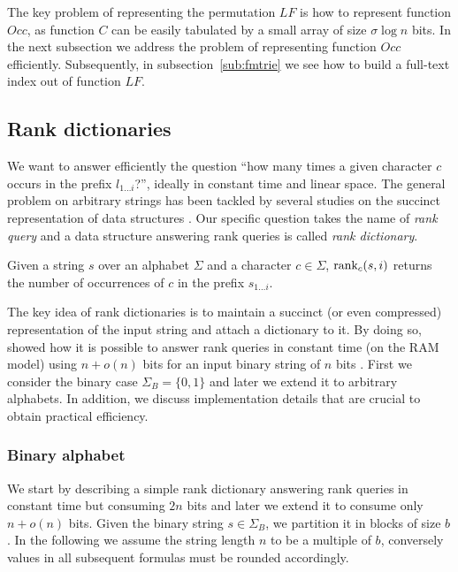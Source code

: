 The key problem of representing the permutation $LF$ is how to represent function $Occ$, as function $C$ can be easily tabulated by a small array of size $\sigma \log{n}$ bits.
In the next subsection we address the problem of representing function $Occ$ efficiently. Subsequently, in subsection~\ref{sub:fmtrie} we see how to build a full-text index out of function $LF$.

\subsection{Rank dictionaries}

We want to answer efficiently the question ``how many times a given character $c$ occurs in the prefix $l_{1 \dots i}$?'', ideally in constant time and linear space.
The general problem on arbitrary strings has been tackled by several studies on the succinct representation of data structures \citep{Jacobson1989}.
Our specific question takes the name of \emph{rank query} and a data structure answering rank queries is called \emph{rank dictionary}.

\begin{definition}
Given a string $s$ over an alphabet $\Sigma$ and a character $c \in \Sigma$, $\text{rank}_c(s, i)$ returns the number of occurrences of $c$ in the prefix $s_{1 \dots i}$.
\end{definition}

The key idea of rank dictionaries is to maintain a succinct (or even compressed) representation of the input string and attach a dictionary to it.
By doing so, \citeauthor{Jacobson1989} showed how it is possible to answer rank queries in constant time (on the RAM model) using $n+o(n)$ bits for an input binary string of $n$ bits \citep{Jacobson1989}.
First we consider the binary case $\Sigma_B = \{ 0, 1 \}$ and later we extend it to arbitrary alphabets.
In addition, we discuss implementation details that are crucial to obtain practical efficiency.

\subsubsection{Binary alphabet}

We start by describing a simple rank dictionary answering rank queries in constant time but consuming $2n$ bits and later we extend it to consume only $n + o(n)$ bits.
Given the binary string $s \in \Sigma_B$, we partition it in blocks of size $b$.
In the following we assume \wlogs the string length $n$ to be a multiple of $b$, conversely values in all subsequent formulas must be rounded accordingly.

